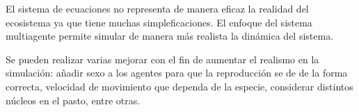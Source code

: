 \documentclass[12pt, twocolumn]{article}
\begin{document}
El sistema de ecuaciones no representa de manera eficaz la realidad del ecosistema ya que tiene muchas simpleficaciones. El enfoque del sistema multiagente permite simular de manera m\'as realista la din\'amica del sistema.

Se pueden realizar varias mejorar con el fin de aumentar el realismo en la simulaci\'on: a\~nadir sexo a los agentes para que la reproducci\'on se de de la forma correcta, velocidad de movimiento que dependa de la especie, considerar distintos n\'ucleos en el pasto, entre otras.



\nocite{*}
\end{document}
